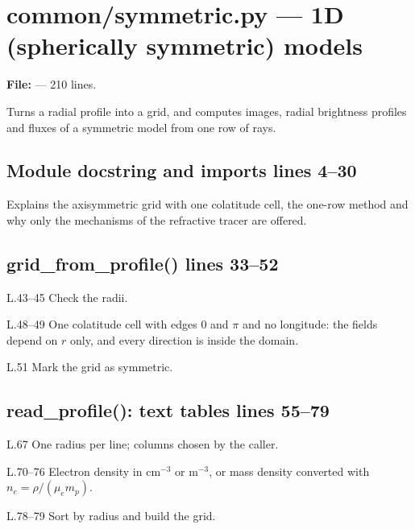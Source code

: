 \chapter{common/symmetric.py --- 1D (spherically symmetric) models}
\label{mod:common:symmetric.py}
\textbf{File:}  --- 210 lines.

Turns a radial profile into a grid, and computes images, radial brightness profiles and
fluxes of a symmetric model from one row of rays.

\section*{\normalsize Module docstring and imports \hfill{\small\mdseries\color{gray}lines 4--30}}

Explains the axisymmetric grid with one colatitude cell, the one-row method and why only the mechanisms of the refractive tracer are offered.

\section*{\normalsize grid\_from\_profile() \hfill{\small\mdseries\color{gray}lines 33--52}}

\begin{lines}
\item[L.43–45] Check the radii.
\item[L.48–49] One colatitude cell with edges $0$ and $\pi$ and no longitude: the fields depend on $r$ only, and every direction is inside the domain.
\item[L.51] Mark the grid as symmetric.
\end{lines}
\section*{\normalsize read\_profile(): text tables \hfill{\small\mdseries\color{gray}lines 55--79}}

\begin{lines}
\item[L.67] One radius per line; columns chosen by the caller.
\item[L.70–76] Electron density in cm$^{-3}$ or m$^{-3}$, or mass density converted with $n_e=\rho/(\mu_em_p)$.
\item[L.78–79] Sort by radius and build the grid.
\end{lines}
